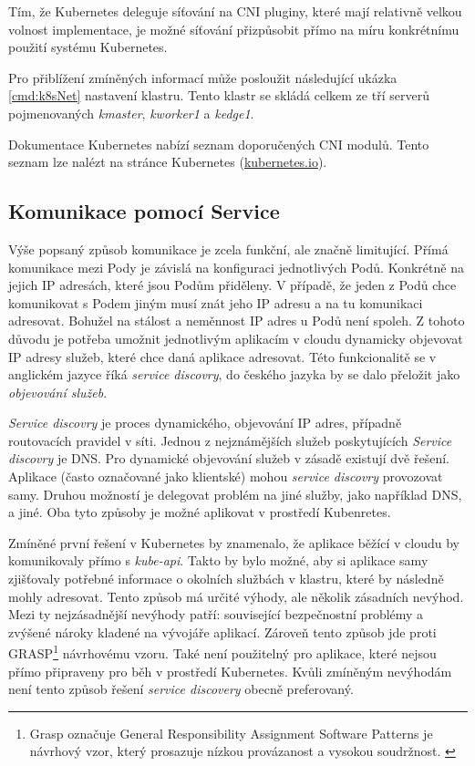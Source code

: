 \bigskip

Tím, že Kubernetes deleguje síťování na CNI pluginy, které mají relativně velkou volnost implementace, je možné síťování přizpůsobit přímo na míru konkrétnímu použití systému Kubernetes.

Pro přiblížení zmíněných informací může posloužit následující ukázka \ref{cmd:k8sNet} nastavení klastru. Tento klastr se skládá celkem ze tří serverů pojmenovaných \textit{kmaster}, \textit{kworker1} a \textit{kedge1}. \cite{thekubernetesauthors_2023_kubectl}




Dokumentace Kubernetes nabízí seznam doporučených CNI modulů. Tento seznam lze nalézt na stránce Kubernetes (\href{https://kubernetes.io/docs/concepts/cluster-administration/addons/#networking-and-network-policy}{kubernetes.io}).

\subsection{Komunikace pomocí Service}
Výše popsaný způsob komunikace je zcela funkční, ale značně limitující. Přímá komunikace mezi Pody je závislá na konfiguraci jednotlivých Podů. Konkrétně na jejich IP adresách, které jsou Podům přiděleny. V případě, že jeden z Podů chce komunikovat s Podem jiným musí znát jeho IP adresu a na tu komunikaci adresovat. Bohužel na stálost a neměnnost IP adres u Podů není spoleh. Z tohoto důvodu je potřeba umožnit jednotlivým aplikacím v cloudu dynamicky objevovat IP adresy služeb, které chce daná aplikace adresovat. Této funkcionalitě se v anglickém jazyce říká \textit{service discovry}, do českého jazyka by se dalo přeložit jako \textit{objevování služeb}. 

\textit{Service discovry} je proces dynamického, objevování IP adres, případně routovacích pravidel v síti. Jednou z nejznámějších služeb poskytujících \textit{Service discovry} je DNS. Pro dynamické objevování služeb v zásadě existují dvě řešení. Aplikace (často označované jako klientské) mohou \textit{service discovry} provozovat samy. Druhou možností je delegovat problém na jiné služby, jako například DNS, a jiné. Oba tyto způsoby je možné aplikovat v prostředí Kubenretes. 

Zmíněné první řešení v Kubernetes by znamenalo, že aplikace běžící v cloudu by komunikovaly přímo s \textit{kube-api}. Takto by bylo možné, aby si aplikace samy zjišťovaly potřebné informace o okolních službách v klastru, které by následně mohly adresovat. Tento způsob má určité výhody, ale několik zásadních nevýhod. Mezi ty nejzásadnější nevýhody patří: související bezpečnostní problémy a zvýšené nároky kladené na vývojáře aplikací. Zároveň tento způsob jde proti GRASP\footnote{Grasp označuje General Responsibility Assignment Software Patterns je návrhový vzor, který prosazuje nízkou provázanost a vysokou soudržnost. \cite{mlejnek_2018_architektonick}} návrhovému vzoru. Také není použitelný pro aplikace, které nejsou přímo připraveny pro běh v prostředí Kubernetes. Kvůli zmíněným nevýhodám není tento způsob řešení \textit{service discovery} obecně preferovaný.

